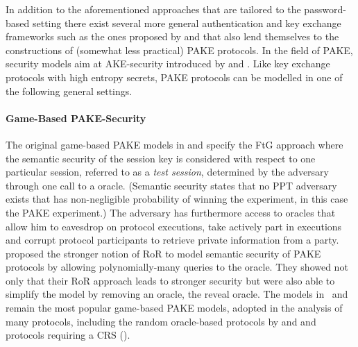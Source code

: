 In addition to the aforementioned approaches that are tailored to the password-based setting there exist several more general authentication and key exchange frameworks such as the ones proposed by \citet{Camenisch2010} and \citet{Blazy2012} that also lend themselves to the constructions of (somewhat less practical) \ac{PAKE} protocols.
In the field of \acl{PAKE}, security models aim at \ac{AKE}-security introduced by \citet{Bellare1993} and \citet{Bellare1995}.
Like key exchange protocols with high entropy secrets, \ac{PAKE} protocols can be modelled in one of the following general settings.

\paragraph{Game-Based \ac{PAKE}-Security}
The original game-based \ac{PAKE} models in \citet{Bellare2000} and \citet{Boyko2000} specify the \ac{FtG} approach where the semantic security of the session key is considered with respect to one particular session, referred to as a \emph{test session}, determined by the adversary through one call to a \Test oracle.
(Semantic security states that no \ac{PPT} adversary exists that has non-negligible probability of winning the experiment, in this case the \ac{PAKE} experiment.)
The adversary has furthermore access to oracles that allow him to eavesdrop on protocol executions, take actively part in executions and corrupt protocol participants to retrieve private information from a party.
\citet{Abdalla2005} proposed the stronger notion of \ac{RoR} to model semantic security of PAKE protocols by allowing polynomially-many queries to the \Test oracle.
They showed not only that their \ac{RoR} approach leads to stronger security but were also able to simplify the model by removing an oracle, \ie the reveal oracle.
The models in~\citet{Bellare2000} and \citet{Abdalla2005} remain the most popular game-based PAKE models, adopted in the analysis of many protocols, including the random oracle-based protocols by \citet{Abdalla2006} and \citet{Abdalla2005b} and protocols requiring a \ac{CRS} (\citet{KatzOY01,Gennaro2003,Gennaro2008,Katz2009a}).


